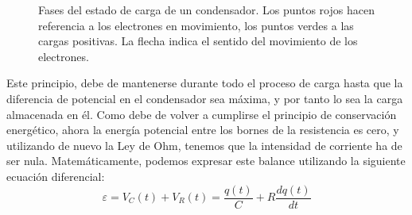 \documentclass[../main.tex]{subfiles}
\begin{document}
\begin{figure}[!h]
    \centering
    \caption{Fases del estado de carga de un condensador. Los puntos rojos hacen referencia a los electrones en movimiento, los puntos verdes a las cargas positivas. La flecha indica el sentido del movimiento de los electrones.}
    \label{fig::carga_condensador}
\end{figure}


Este principio, debe de mantenerse durante todo el proceso de carga hasta que la diferencia de potencial en el condensador sea máxima, y por tanto lo sea la carga almacenada en él. Como debe de volver a cumplirse el principio de conservación energético, ahora la energía potencial entre los bornes de la resistencia es cero, y utilizando de nuevo la Ley de Ohm, tenemos que la intensidad de corriente ha de ser nula. Matemáticamente, podemos expresar este balance utilizando la siguiente ecuación diferencial:
\begin{equation}
    \varepsilon = V_C(t) + V_R(t) = \frac{q(t)}{C} + R\frac{d q(t)}{d t}
    \label{eqq::balance_energetico_rc_1}
\end{equation}
\end{document}
